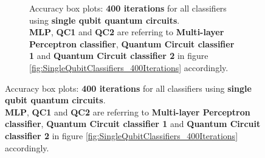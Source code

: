 \begin{figure}[h!]
\begin{subfigure}{1.0\textwidth}
\begin{subfigure}{1.0\textwidth}
{            }
        \end{subfigure}
        \begin{subfigure}{1.0\textwidth}
            \centering
        \end{subfigure}
        \begin{subfigure}{1.0\textwidth}
            \centering
        \end{subfigure}
        \caption{Accuracy box plots: \textbf{400 iterations} for all classifiers using \textbf{single qubit quantum circuits}.\\ \textbf{MLP}, \textbf{QC1} and \textbf{QC2} are referring to \textbf{Multi-layer Perceptron classifier}, \textbf{Quantum Circuit classifier 1} and \textbf{Quantum Circuit classifier 2} in figure \ref{fig:SingleQubitClassifiers_400Iterations} accordingly.}
        \label{fig:SingleQubitClassifiers_400Iterations_boxplot}
    \end{subfigure}
\end{figure}


